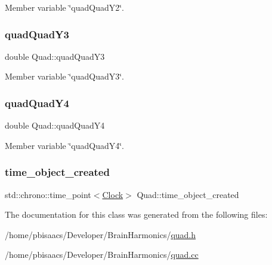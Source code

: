 Member variable \char`\"{}quad\+Quad\+Y2\char`\"{}. 

\mbox{\label{classQuad_a71c344b5032f910a34a8ffef7ba894c0}} 
\subsubsection{\texorpdfstring{quad\+Quad\+Y3}{quadQuadY3}}
{\footnotesize\ttfamily double Quad\+::quad\+Quad\+Y3\hspace{0.3cm}{\ttfamily [private]}}



Member variable \char`\"{}quad\+Quad\+Y3\char`\"{}. 

\mbox{\label{classQuad_a0e7d3d2357464cbe78d73750b2399d95}} 
\subsubsection{\texorpdfstring{quad\+Quad\+Y4}{quadQuadY4}}
{\footnotesize\ttfamily double Quad\+::quad\+Quad\+Y4\hspace{0.3cm}{\ttfamily [private]}}



Member variable \char`\"{}quad\+Quad\+Y4\char`\"{}. 

\mbox{\label{classQuad_a5779e2e09362b665bccd2ae4e29602ff}} 
\subsubsection{\texorpdfstring{time\+\_\+object\+\_\+created}{time\_object\_created}}
{\footnotesize\ttfamily std\+::chrono\+::time\+\_\+point$<$\mbox{\hyperlink{universe_8h_a0ef8d951d1ca5ab3cfaf7ab4c7a6fd80}{Clock}}$>$ Quad\+::time\+\_\+object\+\_\+created\hspace{0.3cm}{\ttfamily [private]}}



The documentation for this class was generated from the following files\+:\begin{DoxyCompactItemize}
\item 
/home/pbisaacs/\+Developer/\+Brain\+Harmonics/\mbox{\hyperlink{quad_8h}{quad.\+h}}\item 
/home/pbisaacs/\+Developer/\+Brain\+Harmonics/\mbox{\hyperlink{quad_8cc}{quad.\+cc}}\end{DoxyCompactItemize}
